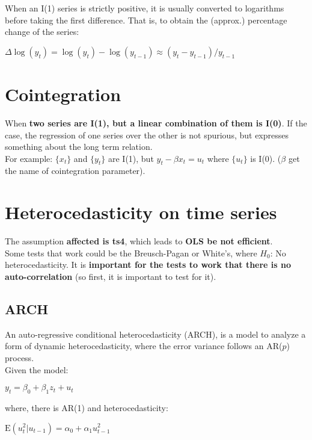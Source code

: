 \documentclass[10pt, a4paper, landscape]{extarticle}
\newcommand{\E}{\mathrm{E}}
\begin{document}
\begin{multicols}{3}
\begin{multicols}{2}
		\end{multicols}
		When an I(1) series is strictly positive, it is usually converted to logarithms before taking the first difference. That is, to obtain the (approx.) percentage change of the series:
		\begin{center}
			$\Delta \log(y_t) = \log(y_t) - \log(y_{t-1}) \approx (y_t - y_{t-1}) / y_{t-1}$
		\end{center}
\columnbreak
\section*{Cointegration}
	When \textbf{two series are I(1), but a linear combination of them is I(0)}. If the case, the regression of one series over the other is not spurious, but expresses something about the long term relation. \\
	For example: $\lbrace x_t \rbrace$ and $\lbrace y_t \rbrace$ are I(1), but $y_t - \beta x_t = u_t$ where $\lbrace u_t \rbrace$ is I(0). ($\beta$ get the name of cointegration parameter).

\section*{Heterocedasticity on time series}
	The assumption \textbf{affected is ts4}, which leads to \textbf{OLS be not efficient}. \\ 
	Some tests that work could be the Breusch-Pagan or White's, where $H_0$: No heterocedasticity. It is \textbf{important for the tests to work that there is no auto-correlation} (so first, it is important to test for it).
	\subsection*{ARCH}
		An auto-regressive conditional heterocedasticity (ARCH), is a model to analyze a form of dynamic heterocedasticity, where the error variance follows an AR($p$) process. \\
		Given the model:
		\begin{center}
			$y_t = \beta_0 + \beta_1 z_t + u_t$
		\end{center}
		where, there is AR(1) and heterocedasticity:
		\begin{center}
			$\E(u^2_t | u_{t-1}) = \alpha_0 + \alpha_1 u^2_{t-1}$
		\end{center}

\end{multicols}
\end{document}
